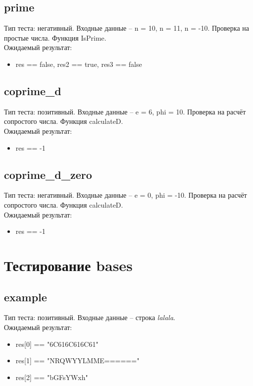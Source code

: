 \documentclass{article}
\begin{document}
\subsection{prime}
Тип теста: негативный.
Входные данные -- n = 10, n = 11, n = -10. Проверка на простые числа. Функция IsPrime.\\
Ожидаемый результат: 
\begin{itemize}
    \item res == false, res2 == true, res3 == false 
\end{itemize}

\subsection{coprime\_d}
Тип теста: позитивный.
Входные данные -- e = 6, phi = 10. Проверка на расчёт сопростого числа. Функция calculateD.\\
Ожидаемый результат: 
\begin{itemize}
    \item res == -1 
\end{itemize}

\subsection{coprime\_d\_zero}
Тип теста: негативный.
Входные данные -- e = 0, phi = -10. Проверка на расчёт сопростого числа. Функция calculateD.\\
Ожидаемый результат: 
\begin{itemize}
    \item res == -1 
\end{itemize}

\section{Тестирование bases}
\subsection{example}
Тип теста: позитивный.
Входные данные -- строка \textit{lalala}.\\
Ожидаемый результат: 
\begin{itemize}
    \item res[0] == "6C616C616C61"
    \item res[1] == "NRQWYYLMME======"
    \item res[2] == "bGFsYWxh" 
\end{itemize}
\end{document}
